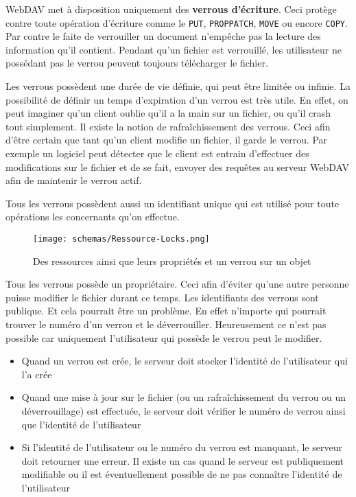 \documentclass[a4paper, 11pt]{article}
\begin{document}
{		WebDAV met à disposition uniquement des \textbf{verrous d'écriture}. Ceci protège contre toute opération d'écriture comme le \texttt{PUT}, \texttt{PROPPATCH}, \texttt{MOVE} ou encore \texttt{COPY}. Par contre le faite de verrouiller un document n'empêche pas la lecture des information qu'il contient. Pendant qu'un fichier est verrouillé, les utilisateur ne possédant pas le verrou peuvent toujours télécharger le fichier. 
		
		Les verrous possèdent une durée de vie définie, qui peut être limitée ou infinie. La possibilité de définir un temps d'expiration d'un verrou est très utile. En effet, on peut imaginer qu'un client oublie qu'il a la main sur un fichier, ou qu'il crash tout simplement. Il existe la notion de rafraîchissement des verrous. Ceci afin d'être certain que tant qu'un client modifie un fichier, il garde le verrou. Par exemple un logiciel peut détecter que le client est entrain d'effectuer des modifications sur le fichier et de se fait, envoyer des requêtes au serveur WebDAV afin de maintenir le verrou actif. 
		
		Tous les verrous possèdent aussi un identifiant unique qui est utilisé pour toute opérations les concernants qu'on effectue. 
	
			\begin{figure}[htc]
			\begin{center}
			\texttt{[image: schemas/Ressource-Locks.png]}
			\caption{Des ressources ainsi que leurs propriétés et un verrou sur un objet}
			\label{fig:file_lock}
			\end{center}
			\end{figure}
		
		Tous les verrous possède un propriétaire. Ceci afin d'éviter qu'une autre personne puisse modifier le fichier durant ce temps. Les identifiants des verrous sont publique. Et cela pourrait être un problème. En effet n'importe qui pourrait trouver le numéro d'un verrou et le déverrouiller. Heureusement ce n'est pas possible car uniquement l'utilisateur qui possède le verrou peut le modifier.
		
		\begin{itemize}
			\item Quand un verrou est crée, le serveur doit stocker l'identité de l'utilisateur qui l'a crée
			\item Quand une mise à jour sur le fichier (ou un rafraîchissement du verrou ou un déverrouillage) est effectuée, le serveur doit vérifier le numéro de verrou ainsi que l'identité de l'utilisateur
			\item Si l'identité de l'utilisateur ou le numéro du verrou est manquant, le serveur doit retourner une erreur. Il existe un cas quand le serveur est publiquement modifiable ou il est éventuellement possible de ne pas connaître l'identité de l'utilisateur
		\end{itemize}
		
}
\end{document}

